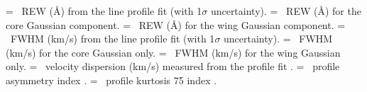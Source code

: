 \begin{table*}
{ = \civ\ REW (\AA ) from the line profile fit (with 1$\sigma$ uncertainty). 
 = \civ\ REW (\AA ) for the core Gaussian component.
 = \civ\ REW (\AA ) for the wing Gaussian component.
 = \civ\ FWHM (km/s) from the line profile fit (with 1$\sigma$ uncertainty). 
 = \civ\ FWHM (km/s) for the core Gaussian only.
 = \civ\ FWHM (km/s) for the wing Gaussian only.
 = \civ\ velocity dispersion (km/s) measured from the profile fit \citep{Peterson2004}.
 = \civ\ profile asymmetry index \citep{Marziani1996}.
 = \civ\ profile kurtosis 75 index \citep{Marziani1996}.
} 
 \label{tab:Ham17_lines}
\end{table*}

